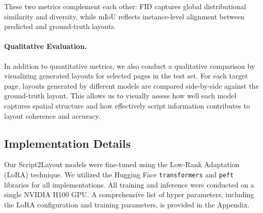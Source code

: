 These two metrics complement each other: FID captures global distributional similarity and diversity, while mIoU reflects instance-level alignment between predicted and ground-truth layouts.

\paragraph{Qualitative Evaluation.}
In addition to quantitative metrics, we also conduct a qualitative comparison by visualizing generated layouts for selected pages in the test set. For each target page, layouts generated by different models are compared side-by-side against the ground-truth layout. This allows us to visually assess how well each model captures spatial structure and how effectively script information contributes to layout coherence and accuracy.

\subsection{Implementation Details}
Our Script2Layout models were fine-tuned using the Low-Rank Adaptation (LoRA) technique. We utilized the Hugging Face \texttt{transformers} and \texttt{peft} libraries for all implementations. All training and inference were conducted on a single NVIDIA H100 GPU. A comprehensive list of hyper parameters, including the LoRA configuration and training parameters, is provided in the Appendix.


